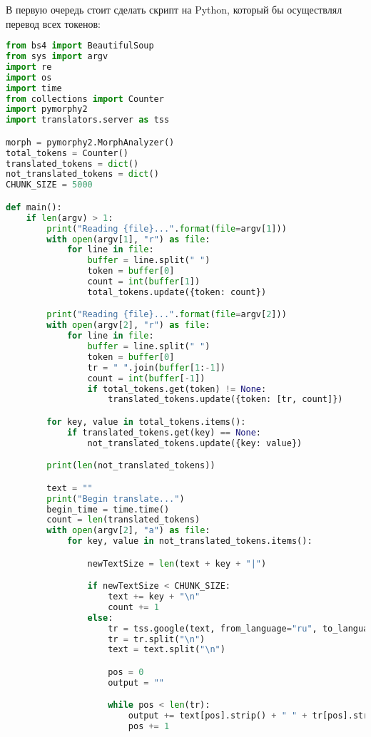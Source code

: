 В первую очередь стоит сделать скрипт на Python, который бы осуществлял перевод всех токенов:
\begin{lstlisting}[language=Python]
from bs4 import BeautifulSoup
from sys import argv
import re
import os
import time
from collections import Counter
import pymorphy2
import translators.server as tss

morph = pymorphy2.MorphAnalyzer()
total_tokens = Counter()
translated_tokens = dict()
not_translated_tokens = dict()
CHUNK_SIZE = 5000

def main():
    if len(argv) > 1:
        print("Reading {file}...".format(file=argv[1]))
        with open(argv[1], "r") as file:
            for line in file:
                buffer = line.split(" ")
                token = buffer[0]
                count = int(buffer[1])
                total_tokens.update({token: count})

        print("Reading {file}...".format(file=argv[2]))
        with open(argv[2], "r") as file:
            for line in file:
                buffer = line.split(" ")
                token = buffer[0]
                tr = " ".join(buffer[1:-1])
                count = int(buffer[-1])
                if total_tokens.get(token) != None:
                    translated_tokens.update({token: [tr, count]})

        for key, value in total_tokens.items():
            if translated_tokens.get(key) == None:
                not_translated_tokens.update({key: value})

        print(len(not_translated_tokens))

        text = ""
        print("Begin translate...")
        begin_time = time.time()
        count = len(translated_tokens)
        with open(argv[2], "a") as file:
            for key, value in not_translated_tokens.items():

                newTextSize = len(text + key + "|")

                if newTextSize < CHUNK_SIZE:
                    text += key + "\n"
                    count += 1
                else:
                    tr = tss.google(text, from_language="ru", to_language="en")
                    tr = tr.split("\n")
                    text = text.split("\n")

                    pos = 0
                    output = ""

                    while pos < len(tr):
                        output += text[pos].strip() + " " + tr[pos].strip().lower() + " " + str(value) + "\n"
                        pos += 1


\end{lstlisting}
